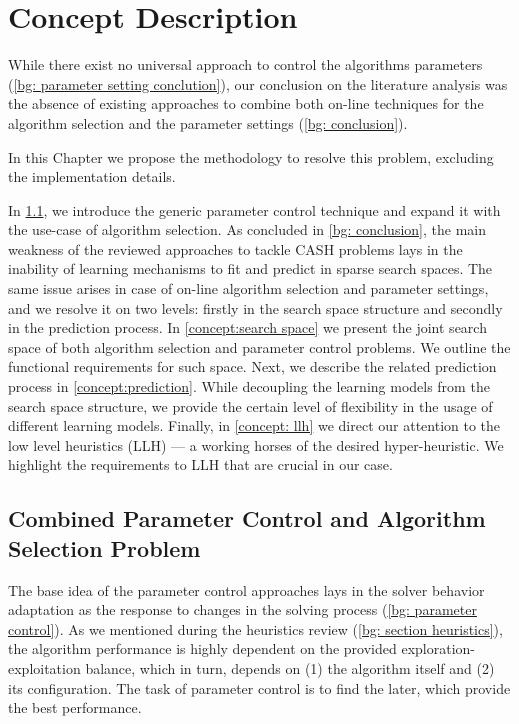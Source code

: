 \chapter{Concept Description}\label{Concept description}
While there exist no universal approach to control the algorithms parameters (\cref{bg: parameter setting conclution}), our conclusion on the literature analysis was the absence of existing approaches to combine both on-line techniques for the algorithm selection and the parameter settings (\cref{bg: conclusion}). 

In this Chapter we propose the methodology to resolve this problem, excluding the implementation details.

In \cref{concept:parameter control}, we introduce the generic parameter control technique and expand it with the use-case of algorithm selection. As concluded in \cref{bg: conclusion}, the main weakness of the reviewed approaches to tackle CASH problems lays in the inability of learning mechanisms to fit and predict in sparse search spaces. The same issue arises in case of on-line algorithm selection and parameter settings, and we resolve it on two levels: firstly in the search space structure and secondly in the prediction process. In \cref{concept:search space} we present the joint search space of both algorithm selection and parameter control problems. We outline the functional requirements for such space. Next, we describe the related prediction process in \cref{concept:prediction}. While decoupling the learning models from the search space structure, we provide the certain level of flexibility in the usage of different learning models.
Finally, in \cref{concept: llh} we direct our attention to the low level heuristics (LLH) — a working horses of the desired hyper-heuristic. We highlight the requirements to LLH that are crucial in our case.


\section{Combined Parameter Control and Algorithm Selection Problem}\label{concept:parameter control}
The base idea of the parameter control approaches lays in the solver behavior adaptation as the response to changes in the solving process (\cref{bg: parameter control}). As we mentioned during the heuristics review (\cref{bg: section heuristics}), the algorithm performance is highly dependent on the provided exploration-exploitation balance, which in turn, depends on (1) the algorithm itself and (2) its configuration. The task of parameter control is to find the later, which provide the best performance.

